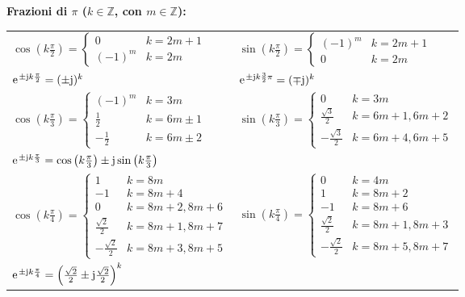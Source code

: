 \noindent\textbf{Frazioni di $\pi$ ($k \in \mathbb{Z}$, con $m \in \mathbb{Z}$):}
\begin{center}
\begin{tabular}{ll}
    $\cos\left(k\frac{\pi}{2}\right) = \begin{cases} 0 & k = 2m+1 \\ (-1)^m & k = 2m \end{cases}$ & 
    $\sin\left(k\frac{\pi}{2}\right) = \begin{cases} (-1)^m & k = 2m+1 \\ 0 & k = 2m \end{cases}$ \\
    \noalign{\vspace{0.15cm}}
    $\e^{\pm\jimg k\frac{\pi}{2}} = (\pm\jimg)^k$ & 
    $\e^{\pm\jimg k\frac{3}{2}\pi} = (\mp\jimg)^k$ \\
    \noalign{\vspace{0.15cm}}
    $\cos\left(k\frac{\pi}{3}\right) = \begin{cases} (-1)^m & k = 3m \\ \frac{1}{2} & k = 6m \pm 1 \\ -\frac{1}{2} & k = 6m \pm 2 \end{cases}$ &
    $\sin\left(k\frac{\pi}{3}\right) = \begin{cases} 0 & k = 3m \\ \frac{\sqrt{3}}{2} & k = 6m+1, 6m+2 \\ -\frac{\sqrt{3}}{2} & k = 6m+4, 6m+5 \end{cases}$ \\
    \noalign{\vspace{0.15cm}}
    $\e^{\pm\jimg k\frac{\pi}{3}} = \cos\left(k\frac{\pi}{3}\right) \pm \jimg \sin\left(k\frac{\pi}{3}\right)$ & \\
    \noalign{\vspace{0.15cm}}
    $\cos\left(k\frac{\pi}{4}\right) = \begin{cases} 1 & k = 8m \\ -1 & k = 8m+4 \\ 0 & k = 8m+2, 8m+6 \\ \frac{\sqrt{2}}{2} & k = 8m+1, 8m+7 \\ -\frac{\sqrt{2}}{2} & k = 8m+3, 8m+5 \end{cases}$ &
    $\sin\left(k\frac{\pi}{4}\right) = \begin{cases} 0 & k = 4m \\ 1 & k = 8m+2 \\ -1 & k = 8m+6 \\ \frac{\sqrt{2}}{2} & k = 8m+1, 8m+3 \\ -\frac{\sqrt{2}}{2} & k = 8m+5, 8m+7 \end{cases}$ \\
    \noalign{\vspace{0.15cm}}
    $\e^{\pm\jimg k\frac{\pi}{4}} = \left(\frac{\sqrt{2}}{2} \pm \jimg\frac{\sqrt{2}}{2}\right)^k$ & 
\end{tabular}
\end{center}

